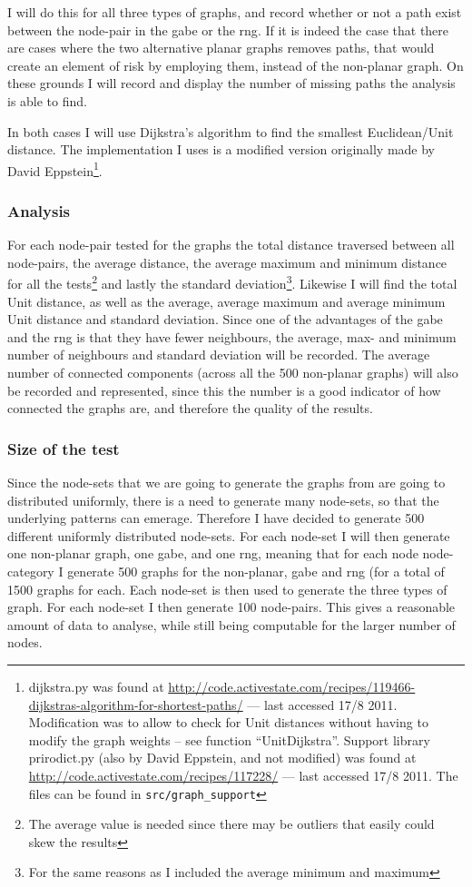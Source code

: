I will do this for all three types of graphs, and record whether or not a path exist between the node-pair in the \ac{gabe} or the \ac{rng}. If it is indeed the case that there are cases where the two alternative planar graphs removes paths, that would create an element of risk by employing them, instead of the non-planar graph. On these grounds I will record and display the number of missing paths the analysis is able to find.

In both cases I will use Dijkstra's algorithm to find the smallest Euclidean/Unit distance. The implementation I uses is a modified version originally made by David Eppstein\footnote{dijkstra.py was found at \url{http://code.activestate.com/recipes/119466-dijkstras-algorithm-for-shortest-paths/} --- last accessed 17/8 2011. Modification was to allow to check for Unit distances without having to modify the graph weights -- see function ``UnitDijkstra''. Support library prirodict.py (also by David Eppstein, and not modified) was found at \url{http://code.activestate.com/recipes/117228/} --- last accessed 17/8 2011. The files can be found in \texttt{src/graph\_support}}.

\subsubsection{Analysis}
For each node-pair tested for the graphs the total distance traversed between all node-pairs, the average distance, the average maximum and minimum distance for all the tests\footnote{The average value is needed since there may be outliers that easily could skew the results} and lastly the standard deviation\footnote{For the same reasons as I included the average minimum and maximum}. Likewise I will find the total Unit distance, as well as the average, average maximum and average minimum Unit distance and standard deviation. Since one of the advantages of the \ac{gabe} and the \ac{rng} is that they have fewer neighbours, the average, max- and minimum number of neighbours and standard deviation will be recorded. The average number of connected components (across all the 500 non-planar graphs) will also be recorded and represented, since this the number is a good indicator of how connected the graphs are, and therefore the quality of the results.

\subsubsection{Size of the test}
Since the node-sets that we are going to generate the graphs from are going to distributed uniformly, there is a need to generate many node-sets, so that the underlying patterns can emerage. Therefore I have decided to generate 500 different uniformly distributed node-sets. For each node-set I will then generate one non-planar graph, one \ac{gabe}, and one \ac{rng}, meaning that for each node node-category I  generate 500 graphs for the non-planar, \ac{gabe} and \ac{rng} (for a total of 1500 graphs for each. Each node-set is then used to generate the three types of graph. For each node-set I then generate 100 node-pairs. This gives a reasonable amount of data to analyse, while still being computable for the larger number of nodes.

